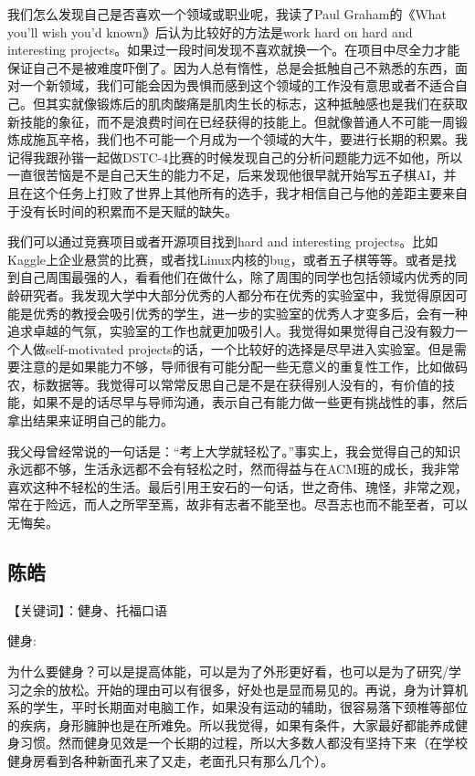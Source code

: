 \documentclass{vivid_layout}
\begin{document}
我们怎么发现自己是否喜欢一个领域或职业呢，我读了Paul Graham的《What you'll wish you'd known》后认为比较好的方法是work hard on hard and interesting projects。如果过一段时间发现不喜欢就换一个。在项目中尽全力才能保证自己不是被难度吓倒了。因为人总有惰性，总是会抵触自己不熟悉的东西，面对一个新领域，我们可能会因为畏惧而感到这个领域的工作没有意思或者不适合自己。但其实就像锻炼后的肌肉酸痛是肌肉生长的标志，这种抵触感也是我们在获取新技能的象征，而不是浪费时间在已经获得的技能上。但就像普通人不可能一周锻炼成施瓦辛格，我们也不可能一个月成为一个领域的大牛，要进行长期的积累。我记得我跟孙锴一起做DSTC-4比赛的时候发现自己的分析问题能力远不如他，所以一直很苦恼是不是自己天生的能力不足，后来发现他很早就开始写五子棋AI，并且在这个任务上打败了世界上其他所有的选手，我才相信自己与他的差距主要来自于没有长时间的积累而不是天赋的缺失。

我们可以通过竞赛项目或者开源项目找到hard and interesting projects。比如Kaggle上企业悬赏的比赛，或者找Linux内核的bug，或者五子棋等等。或者是找到自己周围最强的人，看看他们在做什么，除了周围的同学也包括领域内优秀的同龄研究者。我发现大学中大部分优秀的人都分布在优秀的实验室中，我觉得原因可能是优秀的教授会吸引优秀的学生，进一步的实验室的优秀人才变多后，会有一种追求卓越的气氛，实验室的工作也就更加吸引人。我觉得如果觉得自己没有毅力一个人做self-motivated projects的话，一个比较好的选择是尽早进入实验室。但是需要注意的是如果能力不够，导师很有可能分配一些无意义的重复性工作，比如做码农，标数据等。我觉得可以常常反思自己是不是在获得别人没有的，有价值的技能，如果不是的话尽早与导师沟通，表示自己有能力做一些更有挑战性的事，然后拿出结果来证明自己的能力。

我父母曾经常说的一句话是：“考上大学就轻松了。”事实上，我会觉得自己的知识永远都不够，生活永远都不会有轻松之时，然而得益与在ACM班的成长，我非常喜欢这种不轻松的生活。最后引用王安石的一句话，世之奇伟、瑰怪，非常之观，常在于险远，而人之所罕至焉，故非有志者不能至也。尽吾志也而不能至者，可以无悔矣。

\subsection{{ 陈皓}}

【关键词】：健身、托福口语

健身:

为什么要健身？可以是提高体能，可以是为了外形更好看，也可以是为了研究/学习之余的放松。开始的理由可以有很多，好处也是显而易见的。再说，身为计算机系的学生，平时长期面对电脑工作，如果没有运动的辅助，很容易落下颈椎等部位的疾病，身形臃肿也是在所难免。所以我觉得，如果有条件，大家最好都能养成健身习惯。然而健身见效是一个长期的过程，所以大多数人都没有坚持下来（在学校健身房看到各种新面孔来了又走，老面孔只有那么几个）。
\end{document}
